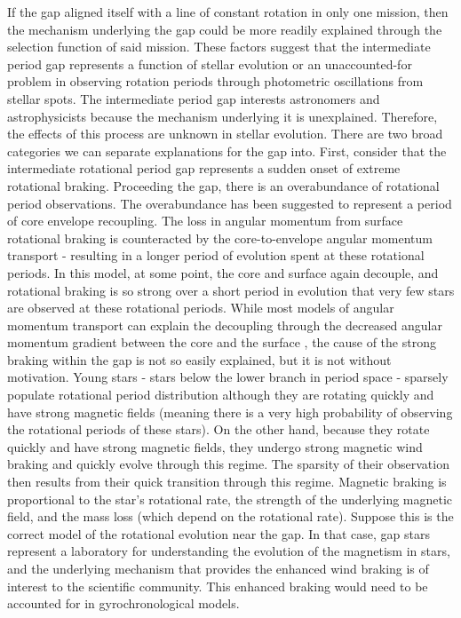 If the gap aligned itself with a line of constant rotation in only one mission, then the mechanism underlying the gap could be more readily explained through the selection function of said mission.
These factors suggest that the intermediate period gap represents a function of stellar evolution or an unaccounted-for problem in observing rotation periods through photometric oscillations from stellar spots.
The intermediate period gap interests astronomers and astrophysicists because the mechanism underlying it is unexplained.
Therefore, the effects of this process are unknown in stellar evolution.
There are two broad categories we can separate explanations for the gap into.
First, consider that the intermediate rotational period gap represents a sudden onset of extreme rotational braking.
Proceeding the gap, there is an overabundance of rotational period observations.
The overabundance has been suggested to represent a period of core envelope recoupling.
The loss in angular momentum from surface rotational braking is counteracted by the core-to-envelope angular momentum transport - resulting in a longer period of evolution spent at these rotational periods.
In this model, at some point, the core and surface again decouple, and rotational braking is so strong over a short period in evolution that very few stars are observed at these rotational periods.
While most models of angular momentum transport can explain the decoupling through the decreased angular momentum gradient between the core and the surface \citep{}, the cause of the strong braking within the gap is not so easily explained, but it is not without motivation.
Young stars - stars below the lower branch in period space - sparsely populate rotational period distribution although they are rotating quickly and have strong magnetic fields (meaning there is a very high probability of observing the rotational periods of these stars).
On the other hand, because they rotate quickly and have strong magnetic fields, they undergo strong magnetic wind braking and quickly evolve through this regime. 
The sparsity of their observation then results from their quick transition through this regime.
Magnetic braking is proportional to the star's rotational rate, the strength of the underlying magnetic field, and the mass loss (which depend on the rotational rate).
Suppose this is the correct model of the rotational evolution near the gap. 
In that case, gap stars represent a laboratory for understanding the evolution of the magnetism in stars, and the underlying mechanism that provides the enhanced wind braking is of interest to the scientific community. 
This enhanced braking would need to be accounted for in gyrochronological models.

